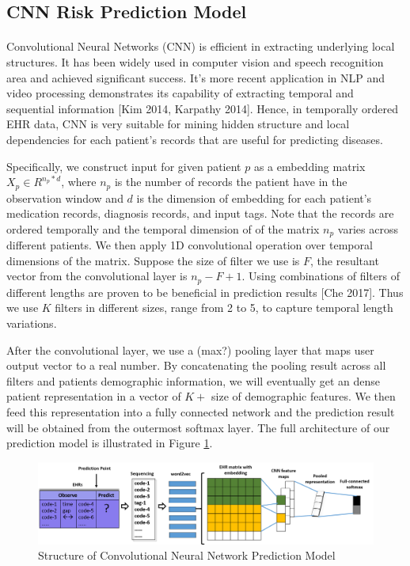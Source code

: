 \documentclass[11pt]{article}
\begin{document}
	\subsection{CNN Risk Prediction Model}
	
	\paragraph{}Convolutional Neural Networks (CNN) is efficient in extracting underlying local structures. It has been widely used in computer vision and speech recognition area and achieved significant success.  It’s more recent application in NLP  and video processing demonstrates its capability of extracting temporal and sequential information [Kim 2014, Karpathy 2014]. Hence, in temporally ordered EHR data, CNN is very suitable for mining hidden structure and local dependencies for each patient’s records that are useful for predicting diseases.
	
	Specifically, we construct input for given patient $p$ as a embedding matrix $X_p \in R^{n_p * d}$, where $n_p$ is the number of records the patient have in the observation window and $d$ is the dimension of embedding for each patient’s medication records, diagnosis records, and input tags. Note that the records are ordered temporally and the temporal dimension of of the matrix $n_p$ varies across different patients. We then apply 1D convolutional operation over temporal dimensions of the matrix. Suppose the size of filter we use is $F$, the resultant vector from the convolutional layer is $n_p-F+1$. Using combinations of filters of different lengths are proven to be beneficial in prediction results [Che 2017]. Thus we use $K$ filters in different sizes, range from 2 to 5, to capture temporal length variations.
	
	After the convolutional layer, we use a (max?) pooling layer that maps user output vector to a real number. By concatenating the pooling result across all filters and patients demographic information, we will eventually get an dense patient representation in a vector of $K+$ size of demographic features. We then feed this representation into a fully connected network and the prediction result will be obtained from the outermost softmax layer.  The full architecture of our prediction model is illustrated in Figure \ref{fig:CNNmodel}.
	
	\begin{figure}[t]
		\centering
		\includegraphics[width=6in]{CNNmodel} 
		\caption{Structure of Convolutional Neural Network Prediction Model}
		\label{fig:CNNmodel}
	\end{figure}
	
\end{document}

